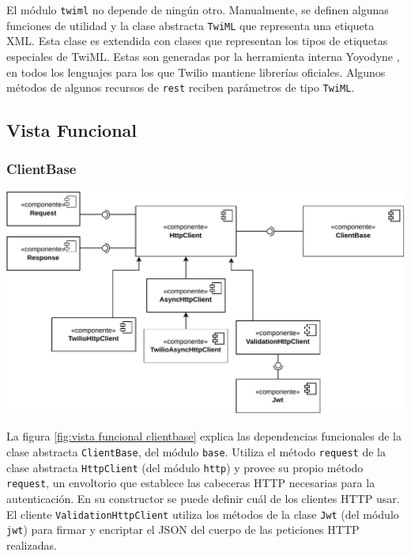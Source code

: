 \documentclass{article}
\begin{document}
\hfill

El módulo \verb|twiml| no depende de ningún otro.
Manualmente, se definen algunas funciones de utilidad
y la clase abstracta \verb|TwiML|
que representa una etiqueta XML.
Esta clase es extendida
con clases que representan los tipos de etiquetas especiales de TwiML.
Estas son generadas por la herramienta interna Yoyodyne
\cite{twilio-generated-yoyodyne},
en todos los lenguajes para los que Twilio mantiene librerías oficiales.
Algunos métodos de algunos recursos de \verb|rest|
reciben parámetros de tipo \verb|TwiML|.

\subsection{Vista Funcional}

\subsubsection{ClientBase}

\hfill

\begin{center}
  \includegraphics[width=\textwidth]{VistaFuncionalClienteBase.pdf}
  \label{fig:vista funcional clientbase}
\end{center}

\hfill

La figura \ref{fig:vista funcional clientbase}
explica las dependencias funcionales de
la clase abstracta \verb|ClientBase|,
del módulo \verb|base|.
Utiliza el método \verb|request|
de la clase abstracta \verb|HttpClient|
(del módulo \verb|http|)
y provee su propio método \verb|request|,
un envoltorio que establece las cabeceras HTTP necesarias para la autenticación.
En su constructor se puede definir cuál de los clientes HTTP usar.
El cliente \verb|ValidationHttpClient|
utiliza los métodos de la clase \verb|Jwt|
(del módulo \verb|jwt|)
para firmar y encriptar el JSON del cuerpo
de las peticiones HTTP realizadas.
\end{document}
